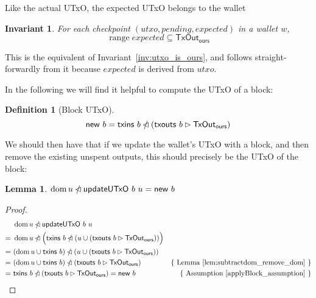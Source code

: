\documentclass{article}
\newcommand{\restrictdom}{\lhd}
\newcommand{\subtractdom}{\mathbin{\slashed{\restrictdom}}}
\newcommand{\restrictrange}{\rhd}
\DeclareMathOperator{\dom}{dom}
\DeclareMathOperator{\range}{range}
\newtheorem{lemma}{Lemma}
\newtheorem{invariant}{Invariant}
\newtheorem{definition}{Definition}
\begin{document}
Like the actual UTxO, the expected UTxO belongs to the wallet

\begin{invariant}
For each checkpoint $(\mathit{utxo}, \mathit{pending}, \mathit{expected})$ in a wallet $w$,
\begin{equation*}
\range \mathit{expected} \subseteq \mathsf{TxOut}_\mathsf{ours}
\end{equation*}
\end{invariant}

This is the equivalent of Invariant~\ref{inv:utxo_is_ours}, and follows
straight-forwardly from it because $\mathit{expected}$ is derived from
$\mathit{utxo}$.

In the following we will find it helpful to compute the UTxO of a block:
%
\begin{definition}[Block UTxO]
\begin{equation*}
\mathsf{new} ~ b = \mathsf{txins} ~ b \subtractdom (\mathsf{txouts} ~ b \restrictrange \mathsf{TxOut_{ours}})
\end{equation*}
\end{definition}
%
We should then have that if we update the wallet's UTxO with a block, and then
remove the existing unspent outputs, this should precisely be the UTxO of
the block:
%
\begin{lemma} \label{lemma:update_remove_dom}
\begin{math}
\dom u \subtractdom \mathsf{updateUTxO} ~ b ~ u  = \mathsf{new} ~ b
\end{math}
\end{lemma}

\begin{proof}
\begin{align*}
  & ~ \dom u \subtractdom \mathsf{updateUTxO} ~ b ~ u \\
= & ~ \dom u \subtractdom \Bigl( \mathsf{txins} ~ b \subtractdom (u \cup (\mathsf{txouts} ~ b \restrictrange \mathsf{TxOut_{ours}})) \Bigr) \\
= & ~ (\dom u \cup \mathsf{txins} ~ b) \subtractdom (u \cup (\mathsf{txouts} ~ b \restrictrange \mathsf{TxOut_{ours}})) \\
= & ~ (\dom u \cup \mathsf{txins} ~ b) \subtractdom (\mathsf{txouts} ~ b \restrictrange \mathsf{TxOut_{ours}}) & \text{\{ Lemma~\ref{lem:subtractdom_remove_dom} \}} \\
= & ~ \mathsf{txins} ~ b \subtractdom (\mathsf{txouts} ~ b \restrictrange \mathsf{TxOut_{ours}}) = \mathsf{new} ~ b & \text{\{ Assumption~\ref{applyBlock_assumption} \}}
\end{align*}
\end{proof}
\end{document}
